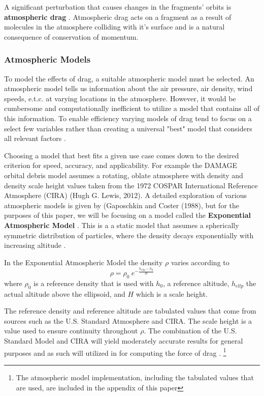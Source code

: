 \documentclass[a4paper, 12pt]{article}
\newcommand{\boldindex}[1]{%
	\textbf{#1}\index{#1}%
}
\begin{document}
A significant perturbation that causes changes in the fragments' orbits is \boldindex{atmospheric drag}. Atmospheric drag acts on a fragment as a result of molecules in the atmosphere colliding with it's surface and is a natural consequence of conservation of momentum. 

\subsubsection{Atmospheric Models}

To model the effects of drag, a suitable atmospheric model must be selected. An atmospheric model tells us information about the air pressure, air density, wind speeds, e.t.c. at varying locations in the atmosphere. However, it would be cumbersome and computationally inefficient to utilize a model that contains all of this information.  To enable efficiency varying models of drag tend to focus on a select few variables rather than creating a universal "best" model that considers all relevant factors \citep{vallado_d._2013}.

Choosing a model that best fits a given use case comes down to the desired criterion for speed, accuracy, and applicability. For example the DAMAGE orbital debris model assumes a rotating, oblate atmosphere with density and density scale height values taken from the 1972 COSPAR International Reference Atmosphere (CIRA) (Hugh G. Lewis, 2012).  A detailed exploration of various atmospheric models is given by (Gaposchkin and Coster (1988), but for the purposes of this paper, we will be focusing on a model called the \boldindex{Exponential Atmospheric Model}. This is a  a static model that assumes a spherically symmetric distribution of particles, where the density decays exponentially with increasing altitude \citep{vallado_d._2013}.

In the Exponential Atmospheric Model the density $\rho$ varies according to
\begin{equation}
	\rho = \rho_0\:e^{-\frac{h_{ellp} - h_0}{H}}
\end{equation}
where $\rho_0$ is a reference density that is used with $h_0$,  a reference altitude,  $h_{ellp}$ the actual altitude above the ellipsoid, and $H$ which is a scale height.

The reference density and reference altitude are tabulated values that come from sources such as the U.S. Standard Atmosphere and CIRA. The scale height is a value used to ensure continuity throughout $\rho$. The combination of the U.S. Standard Model and CIRA will yield moderately accurate results for general purposes and as such will utilized in for computing the force of drag \citep{vallado_d._2013}. \footnote{The atmospheric model implementation, including the tabulated values that are used, are included in the appendix of this paper}
\end{document}
